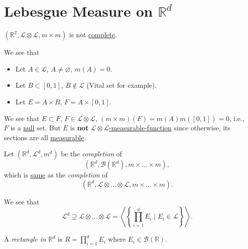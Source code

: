 \section{Lebesgue Measure on \(\mathbb{R} ^d\)}
\begin{eg}
	\((\mathbb{R} ^{2} , \mathcal{L} \otimes \mathcal{L}, m\times m)\) is not
	\hyperref[def:complete-measure-space]{complete}.
\end{eg}
\begin{explanation}
	We see that
	\begin{itemize}
		\item Let \(A\in \mathcal{L} \), \(A\neq \varnothing \), \(m(A) = 0\).
		\item Let \(B\subset [0, 1]\), \(B \notin \mathcal{L} \) (Vital set for example).
		\item Let \(E = A\times B\), \(F = A \times [0, 1]\).
	\end{itemize}
	We see that \(E\subset F\), \(F \in \mathcal{L} \otimes \mathcal{L} \), \((m\times m)(F)=m(A)m([0, 1]) = 0\), i.e.,
	\(F\) is a \hyperref[def:mu-null-set]{null} set. But \(E\) is \textbf{not}
	\hyperref[def:A-measurable-function]{\(\mathcal{L} \otimes \mathcal{L} \)-measurable-function} since otherwise,
	its sections are all \hyperref[def:A-measurable-function]{measurable}.
\end{explanation}
\begin{definition}
	Let \((\mathbb{R} ^d, \mathcal{L} ^d, m^d)\) be the \emph{completion} of
	\[
		(\mathbb{R} ^d, \mathcal{B} (\mathbb{R} ^d), m\times \dots \times m ),
	\]
	which is \underline{same} as the \emph{completion} of
	\[
		(\mathbb{R} ^d, \mathcal{L} \otimes \dots \otimes \mathcal{L}, m\times \dots \times m).
	\]
\end{definition}

\begin{remark}
	We see that
	\[
		\mathcal{L} ^d \supsetneq \mathcal{L} \otimes \dots \otimes \mathcal{L}
		= \left< \left\{ \prod_{i=1}^{d}E_{i} \mid E_{i} \in \mathcal{L}  \right\} \right>.
	\]
\end{remark}

\begin{definition}\label{def:rectangle-in-Rd}
	A \emph{rectangle in \(\mathbb{R} ^d\)} is \(R = \prod_{i=1}^{d} E_{i} \) where \(E_{i}\in \mathcal{B} (\mathbb{R} )\).
\end{definition}


